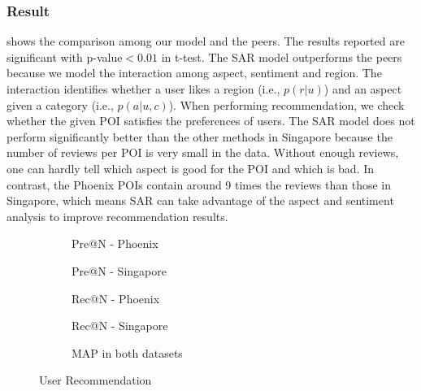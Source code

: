 \subsubsection{Result}
 shows the comparison among our model
and the peers.
The results reported are significant with p-value$<0.01$ in t-test.
The SAR model outperforms the peers because
we model the interaction among aspect,
sentiment and region.
The interaction
identifies whether a user likes a region (i.e., $p(r|u)$) and an aspect given
a category (i.e., $p(a|u,c)$).
When performing recommendation, we check
whether the given POI satisfies the preferences of users.
The SAR model does not perform significantly better than
the other methods in Singapore because the number of reviews
per POI is very small in the data. Without enough reviews,
one can hardly tell which aspect is good for the POI and
which is bad.
In contrast, the Phoenix POIs contain around 9 times the reviews than those
in Singapore, which means SAR can take advantage of the aspect and
sentiment analysis to improve recommendation results.

\begin{figure*}[th]
\begin{subfigure}[t]{0.4\columnwidth}
\centering
{}
\caption{Pre@N - Phoenix}
\end{subfigure}
\begin{subfigure}[t]{0.4\columnwidth}
\centering
{}
\caption{Pre@N - Singapore}
\end{subfigure}
\begin{subfigure}[t]{0.4\columnwidth}
\centering
{}
\caption{Rec@N - Phoenix}
\end{subfigure}
\begin{subfigure}[t]{0.4\columnwidth}
\centering
{}
\caption{Rec@N - Singapore}
\end{subfigure}
\begin{subfigure}[t]{0.4\columnwidth}
\centering
{}
\caption{MAP in both datasets}
\end{subfigure}
\caption{User Recommendation}
\label{fig:user}
\end{figure*}

